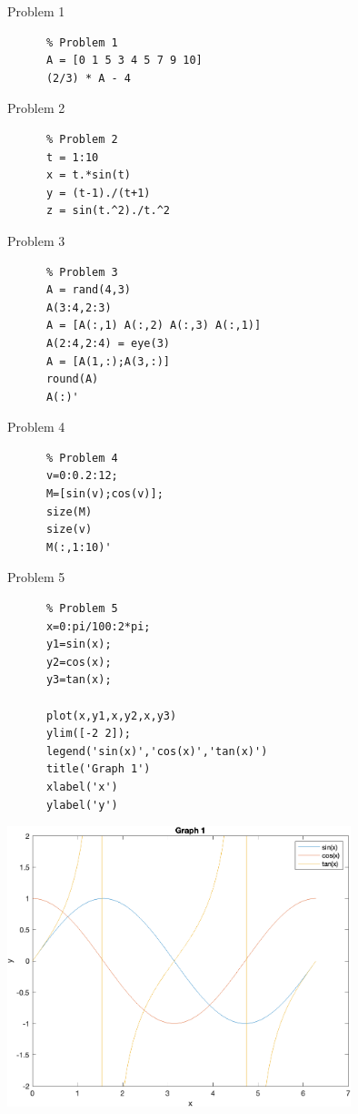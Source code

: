 \documentclass[10pt]{extarticle}
\title{}
\author{Avinash Iyer}
\date{}
\begin{document}
  \begin{problem}{Problem 1}
    \begin{lstlisting}
      % Problem 1
      A = [0 1 5 3 4 5 7 9 10]
      (2/3) * A - 4
    \end{lstlisting}
  \end{problem}
  \begin{problem}{Problem 2}
    \begin{lstlisting}
      % Problem 2
      t = 1:10
      x = t.*sin(t)
      y = (t-1)./(t+1)
      z = sin(t.^2)./t.^2
    \end{lstlisting}
  \end{problem}
  \begin{problem}{Problem 3}
    \begin{lstlisting}
      % Problem 3
      A = rand(4,3)
      A(3:4,2:3)
      A = [A(:,1) A(:,2) A(:,3) A(:,1)]
      A(2:4,2:4) = eye(3)
      A = [A(1,:);A(3,:)]
      round(A)
      A(:)'
    \end{lstlisting}
  \end{problem}
  \begin{problem}{Problem 4}
    \begin{lstlisting}
      % Problem 4
      v=0:0.2:12;
      M=[sin(v);cos(v)];
      size(M)
      size(v)
      M(:,1:10)'
    \end{lstlisting}
  \end{problem}
  \begin{problem}{Problem 5}
    \begin{lstlisting}
      % Problem 5
      x=0:pi/100:2*pi;
      y1=sin(x);
      y2=cos(x);
      y3=tan(x);

      plot(x,y1,x,y2,x,y3)
      ylim([-2 2]);
      legend('sin(x)','cos(x)','tan(x)')
      title('Graph 1')
      xlabel('x')
      ylabel('y')
    \end{lstlisting}
    \begin{center}
      \includegraphics[width=10cm]{problem_5}
    \end{center}
  \end{problem}
\end{document}

